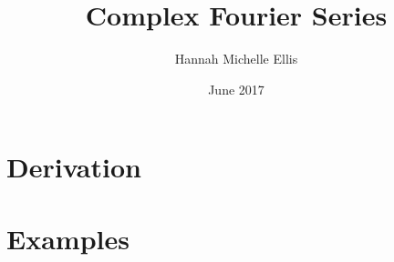 \documentclass[11pt,twoside,a5paper]{book}
\begin{document}
\title{Complex Fourier Series}
\author{Hannah Michelle Ellis}
\date{June 2017}
\maketitle
\tableofcontents
\chapter{Derivation}

\chapter{Examples}

\end{document}
